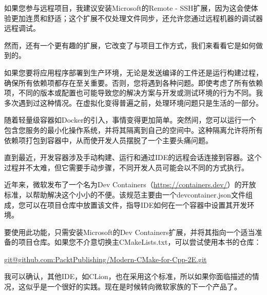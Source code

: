 如果您参与远程项目，我建议安装Microsoft的Remote - SSH扩展，因为这会使体验更加连贯和舒适；这个扩展不仅处理文件同步，还允许您通过远程机器的调试器远程调试。

然而，还有一个更有趣的扩展，它改变了与项目工作方式，我们来看看它是如何做到的。


如果您要将应用程序部署到生产环境，无论是发送编译的工件还是运行构建过程，确保所有依赖项都存在至关重要。否则，您将遇到各种问题。即使考虑了所有依赖项，不同的版本或配置也可能导致您的解决方案与开发或测试环境的行为不同。我多次遇到过这种情况。在虚拟化变得普遍之前，处理环境问题只是生活的一部分。

随着轻量级容器如Docker的引入，事情变得更加简单。突然间，您可以运行一个包含您服务的最小化操作系统，并将其隔离到自己的空间中。这种隔离允许将所有依赖项打包到容器中，从而使开发人员摆脱了一个主要头痛问题。

直到最近，开发容器涉及手动构建、运行和通过IDE的远程会话连接到容器。这个过程并不太难，但它需要手动步骤，不同开发人员可能会以不同的方式执行。

近年来，微软发布了一个名为Dev Containers（\url{https://containers.dev/}）的开放标准，以帮助解决这个小小的不便。该规范主要由一个devcontainer.json文件组成，您可以在项目仓库中放置该文件，指导IDE如何在一个容器中设置其开发环境。

要使用此功能，只需安装Microsoft的Dev Containers扩展，并将其指向一个适当准备的项目仓库。如果您不介意切换主CMakeLists.txt，可以尝试使用本书的仓库：

\url{git@github.com:PacktPublishing/Modern-CMake-for-Cpp-2E.git}

我可以确认，其他IDE，如CLion，也在采用这个标准，所以如果你面临描述的情况，这似乎是一个很好的实践。现在是时候转向微软家族的下一个产品了。



















